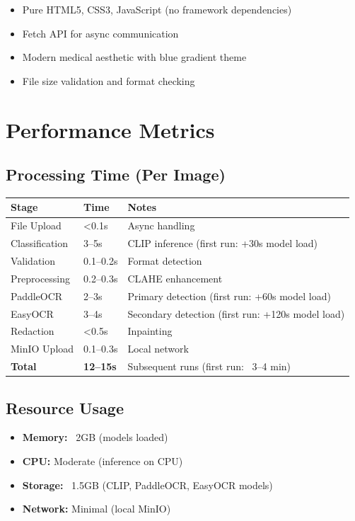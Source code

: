 \documentclass[12pt,a4paper]{article}
\begin{document}
\begin{itemize}[leftmargin=1.2cm]
    \item Pure HTML5, CSS3, JavaScript (no framework dependencies)
    \item Fetch API for async communication
    \item Modern medical aesthetic with blue gradient theme
    \item File size validation and format checking
\end{itemize}

\section{Performance Metrics}

\subsection{Processing Time (Per Image)}

\begin{tabular}{p{5cm} p{3cm} p{4cm}}
\toprule
\textbf{Stage} & \textbf{Time} & \textbf{Notes} \\
\midrule
File Upload & <0.1s & Async handling \\
Classification & 3–5s & CLIP inference (first run: +30s model load) \\
Validation & 0.1–0.2s & Format detection \\
Preprocessing & 0.2–0.3s & CLAHE enhancement \\
PaddleOCR & 2–3s & Primary detection (first run: +60s model load) \\
EasyOCR & 3–4s & Secondary detection (first run: +120s model load) \\
Redaction & <0.5s & Inpainting \\
MinIO Upload & 0.1–0.3s & Local network \\
\textbf{Total} & \textbf{12–15s} & Subsequent runs (first run: ~3–4 min) \\
\bottomrule
\end{tabular}

\subsection{Resource Usage}

\begin{itemize}[leftmargin=1.2cm]
    \item \textbf{Memory:} ~2GB (models loaded)
    \item \textbf{CPU:} Moderate (inference on CPU)
    \item \textbf{Storage:} ~1.5GB (CLIP, PaddleOCR, EasyOCR models)
    \item \textbf{Network:} Minimal (local MinIO)
\end{itemize}
\end{document}

